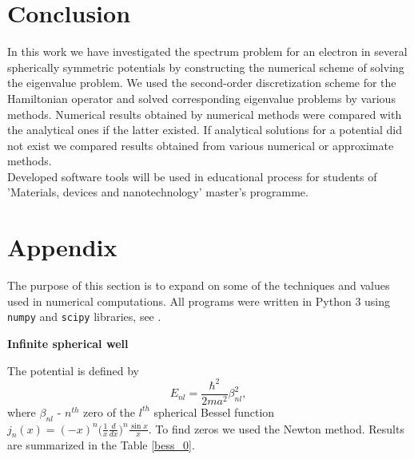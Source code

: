 \documentclass[a4paper, 11pt]{article}
\begin{document}
\section{Conclusion}
In this work we have investigated the spectrum problem for an electron in several spherically symmetric potentials by constructing the numerical scheme of solving the eigenvalue problem. We used the second-order discretization scheme for the Hamiltonian operator and solved corresponding eigenvalue problems by various methods. Numerical results obtained by numerical methods were compared with the analytical ones if the latter existed. If analytical solutions for a potential did not exist we compared results obtained from various numerical or approximate methods.\\
Developed software tools will be used in educational process for students of 'Materials, devices and nanotechnology' master's programme.

\section{Appendix}\label{appendix}
The purpose of this section is to expand on some of the techniques and values used in numerical computations. All programs were written in Python 3 using \texttt{numpy} and \texttt{scipy} libraries, see \cite{MyCode}.
\begin{center}
		\large
		\textbf{ Infinite spherical well}		\\[0.5 cm]
\end{center}
The potential is defined by 
$$E_{nl} = \frac{\hbar^2}{2ma^2}\beta_{nl}^2,$$
where $\beta_{nl}$ -  $n^{th}$ zero of the $l^{th}$ spherical Bessel function $j_n(x) = (-x)^n\bigg(\displaystyle{\frac{1}{x} \frac{d}{dx}}\bigg)^n \frac{\sin{x}}{x}.$
To find zeros we used the Newton method. Results are summarized in the Table \ref{bess_0}.
\end{document}
